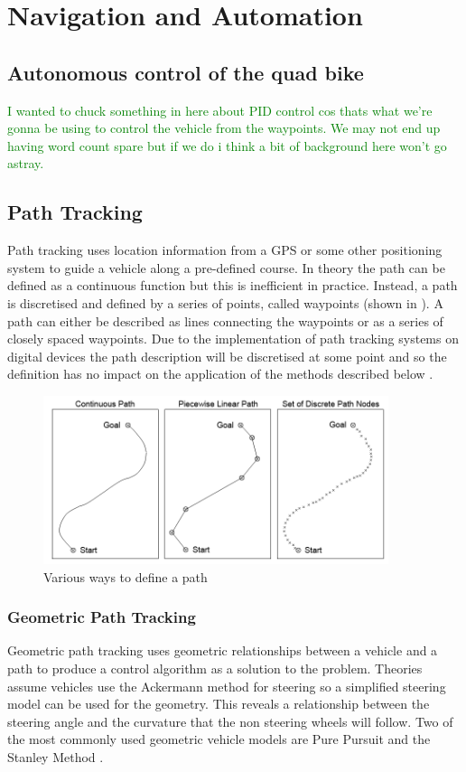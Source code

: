 \documentclass[main.tex]{subfiles}
\begin{document}
\section{Navigation and Automation}
\subsection{Autonomous control of the quad bike}
\textcolor{green}{I wanted to chuck something in here about PID control cos thats what we're gonna be using to control the vehicle from the waypoints. We may not end up having word count spare but if we do i think a bit of background here won't go astray.}

\subsection{Path Tracking}
Path tracking uses location information from a GPS or some other positioning system to guide a vehicle along a pre-defined course. In theory the path can be defined as a continuous function but this is inefficient in practice. Instead, a path is discretised and defined by a series of points, called waypoints (shown in ). A path can either be described as lines connecting the waypoints or as a series of closely spaced waypoints. Due to the implementation of path tracking systems on digital devices the path description will be discretised at some point and so the definition has no impact on the application of the methods described below \parencite{Giesbrecht2005}.
\begin{figure}[ht]
\includegraphics[width=0.9\textwidth]{3-LiteratureReview/pathDefining.png}
\centering
\caption[Various ways to define a path]{Various ways to define a path \parencite{Giesbrecht2005}} 
\end{figure}

\subsubsection{Geometric Path Tracking}
Geometric path tracking uses geometric relationships between a vehicle and a path to produce a control algorithm as a solution to the problem. Theories assume vehicles use the Ackermann method for steering so a simplified steering model can be used for the geometry. This reveals a relationship between the steering angle and the curvature that the non steering wheels will follow. Two of the most commonly used geometric vehicle models are Pure Pursuit and the Stanley Method \parencite{snider2009}.
\end{document}
